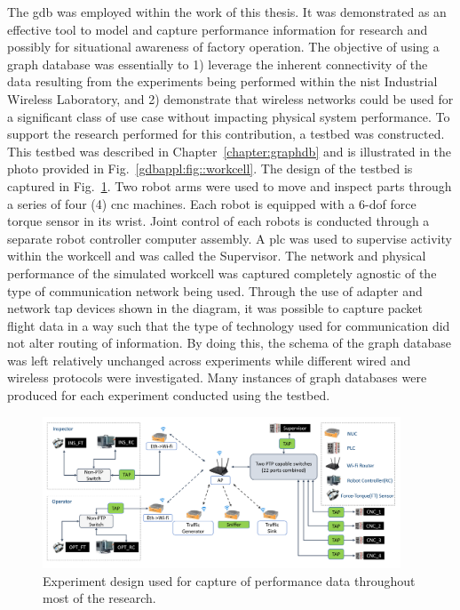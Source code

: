 The \gls{gdb} was employed within the work of this thesis.  It was demonstrated as an effective tool to model and capture performance information for research and possibly for situational awareness of factory operation.  The objective of using a graph database was essentially to 1) leverage the inherent connectivity of the data resulting from the experiments being performed within the \gls{nist} Industrial Wireless Laboratory, and 2) demonstrate that wireless networks could be used for a significant class of use case without impacting physical system performance. To support the research performed for this contribution, a testbed was constructed. This testbed was described in Chapter~\ref{chapter:graphdb} and is illustrated in the photo provided in Fig.~\ref{gdbappl:fig::workcell}.  The design of the testbed is captured in Fig.~\ref{fig:concl:experiment-design}.  Two robot arms were used to move and inspect parts through a series of four (4) \gls{cnc} machines.  Each robot is equipped with a 6-\gls{dof} force torque sensor in its wrist.  Joint control of each robots is conducted through a separate robot controller computer assembly.  A \gls{plc} was used to supervise activity within the workcell and was called the Supervisor.  The network and physical performance of the simulated workcell was captured completely agnostic of the type of communication network being used.  Through the use of adapter and network \gls{tap} devices shown in the diagram, it was possible to capture packet flight data in a way such that the type of technology used for communication did not alter routing of information.  By doing this, the schema of the graph database was left relatively unchanged across experiments while different wired and wireless protocols were investigated. Many instances of graph databases were produced for each experiment conducted using the testbed.

\begin{figure}[!ht]
	\centering
	\includegraphics[width=0.95\textwidth]{chapter-gdb-appl/figures/Fig1TiiSpecialDiagram-testbed2.png}
	\caption{Experiment design used for capture of performance data throughout most of the research.}
	\label{fig:concl:experiment-design}
\end{figure}

